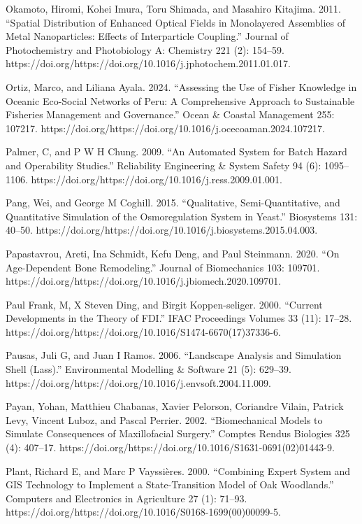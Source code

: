 \documentclass[utf8]{gradu3}
\begin{document}
Okamoto, Hiromi, Kohei Imura, Toru Shimada, and Masahiro Kitajima. 2011. “Spatial Distribution of Enhanced Optical Fields in Monolayered Assemblies of Metal Nanoparticles: Effects of Interparticle Coupling.” Journal of Photochemistry and Photobiology A: Chemistry 221 (2): 154–59. https://doi.org/https://doi.org/10.1016/j.jphotochem.2011.01.017.

Ortiz, Marco, and Liliana Ayala. 2024. “Assessing the Use of Fisher Knowledge in Oceanic Eco-Social Networks of Peru: 
A Comprehensive Approach to Sustainable Fisheries Management and Governance.” Ocean \& Coastal Management 255: 107217. https://doi.org/https://doi.org/10.1016/j.ocecoaman.2024.107217.

Palmer, C, and P W H Chung. 2009. “An Automated System for Batch Hazard and Operability Studies.” Reliability Engineering \& System Safety 94 (6): 1095–1106. https://doi.org/https://doi.org/10.1016/j.ress.2009.01.001.

Pang, Wei, and George M Coghill. 2015. “Qualitative, Semi-Quantitative, and Quantitative Simulation of the Osmoregulation System in Yeast.” Biosystems 131: 40–50. https://doi.org/https://doi.org/10.1016/j.biosystems.2015.04.003.

Papastavrou, Areti, Ina Schmidt, Kefu Deng, and Paul Steinmann. 2020. “On Age-Dependent Bone Remodeling.” Journal of Biomechanics 103: 109701. https://doi.org/https://doi.org/10.1016/j.jbiomech.2020.109701.

Paul Frank, Μ, X Steven Ding, and Birgit Koppen-seliger. 2000. “Current Developments in the Theory of FDI.” IFAC Proceedings Volumes 33 (11): 17–28. https://doi.org/https://doi.org/10.1016/S1474-6670(17)37336-6.

Pausas, Juli G, and Juan I Ramos. 2006. “Landscape Analysis and Simulation Shell (Lass).” Environmental Modelling \& Software 21 (5): 629–39. https://doi.org/https://doi.org/10.1016/j.envsoft.2004.11.009.

Payan, Yohan, Matthieu Chabanas, Xavier Pelorson, Coriandre Vilain, Patrick Levy, Vincent Luboz, and Pascal Perrier. 2002. “Biomechanical Models to Simulate Consequences of Maxillofacial Surgery.” Comptes Rendus Biologies 325 (4): 407–17. https://doi.org/https://doi.org/10.1016/S1631-0691(02)01443-9.

Plant, Richard E, and Marc P Vayssières. 2000. “Combining Expert System and GIS Technology to Implement a State-Transition Model of Oak Woodlands.” Computers and Electronics in Agriculture 27 (1): 71–93. https://doi.org/https://doi.org/10.1016/S0168-1699(00)00099-5.
\end{document}

